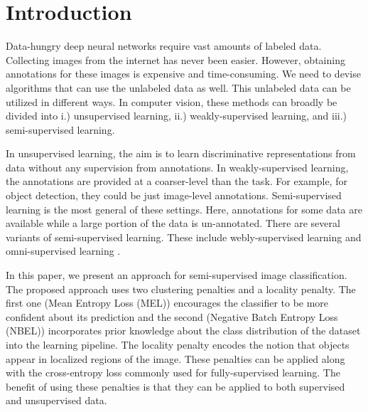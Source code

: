 \section{Introduction}

Data-hungry deep neural networks require vast amounts of labeled data. Collecting images from the
internet has never been easier. However, obtaining annotations for these images is expensive and
time-consuming. We need to devise algorithms that can use the unlabeled data as well. This unlabeled
data can be utilized in different ways. In computer vision, these methods can broadly be divided
into i.) unsupervised learning, ii.) weakly-supervised learning, and iii.) semi-supervised learning.

In unsupervised learning, the aim is to learn discriminative representations from data without any
supervision from annotations. In weakly-supervised learning, the annotations are provided at a
coarser-level than the task. For example, for object detection, they could be just image-level
annotations. Semi-supervised learning is the most general of these settings. Here, annotations for
some data are available while a large portion of the data is un-annotated. There are several
variants of semi-supervised learning. These include webly-supervised learning \cite{} and
omni-supervised learning \cite{}.

In this paper, we present an approach for semi-supervised image classification. The proposed
approach uses two clustering penalties and a locality penalty. The first one (Mean Entropy Loss (MEL)) encourages the
classifier to be more confident about its prediction and the second (Negative Batch Entropy Loss
(NBEL)) incorporates prior knowledge about the class distribution of the dataset into the learning
pipeline. The locality penalty encodes the notion that objects appear in localized regions of the
image. These penalties can be applied along with the cross-entropy loss commonly used for
fully-supervised learning. The benefit of using these penalties is that they can be applied to both
supervised and unsupervised data. 

